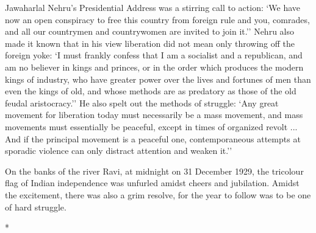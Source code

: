 Jawaharlal Nehru's Presidential Address was a stirring call to action: `We have now an open conspiracy to free this country from foreign rule and you, comrades, and all our countrymen and countrywomen are invited to join it.'' Nehru also made it known that in his view liberation did not mean only throwing off the foreign yoke: `I must frankly confess that I am a socialist and a republican, and am no believer in kings and princes, or in the order which produces the modern kings of industry, who have greater power over the lives and fortunes of men than even the kings of old, and whose methods are as predatory as those of the old feudal aristocracy.'' He also spelt out the methods of struggle: `Any great movement for liberation today must necessarily be a mass movement, and mass movements must essentially be peaceful, except in times of organized revolt ... And if the principal movement is a peaceful one, contemporaneous attempts at sporadic violence can only distract attention and weaken it.'' 

On the banks of the river Ravi, at midnight on 31 December 1929, the tricolour flag of Indian independence was unfurled amidst cheers and jubilation. Amidst the excitement, there was also a grim resolve, for the year to follow was to be one of hard struggle.

\begin{center}*\end{center}

\paragraph*{}

